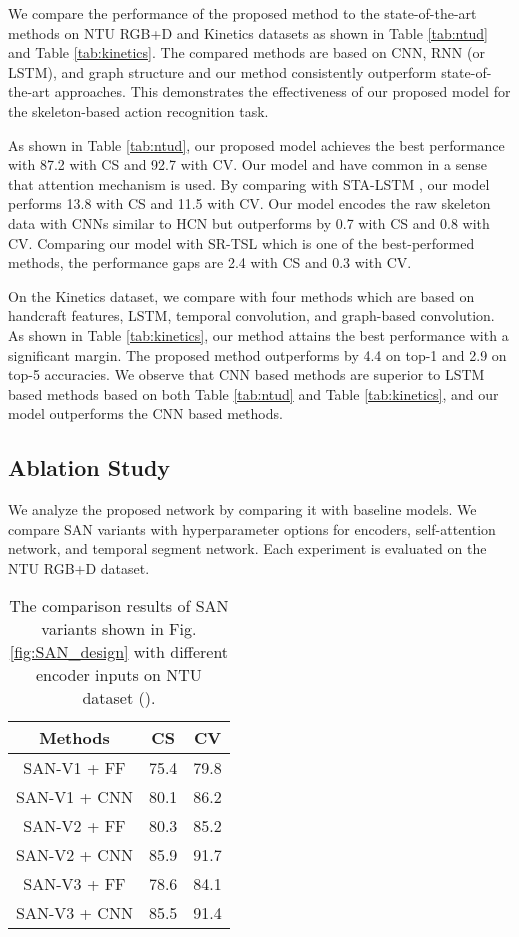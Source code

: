 \documentclass[10pt,twocolumn,letterpaper]{article}
\begin{document}
We compare the performance of the proposed method to the state-of-the-art methods on NTU RGB+D and Kinetics datasets as shown in Table \ref{tab:ntud} and Table \ref{tab:kinetics}. The compared methods are based on CNN, RNN (or LSTM), and graph structure and our method consistently outperform state-of-the-art approaches. This demonstrates the effectiveness of our proposed model for the skeleton-based action recognition task.

As shown in Table \ref{tab:ntud}, our proposed model achieves the best performance with 87.2 with CS and 92.7 with CV. Our model and \cite{STOA:STA-LSTM} have common in a sense that attention mechanism is used. By comparing with STA-LSTM \cite{STOA:STA-LSTM}, our model performs 13.8 with CS and 11.5 with CV. Our model encodes the raw skeleton data with CNNs similar to HCN \cite{STOA:HCN} but outperforms by 0.7 with CS and 0.8 with CV. Comparing our model with SR-TSL \cite{STOA:SR-TSL} which is one of the best-performed methods, the performance gaps are 2.4 with CS and 0.3 with CV.

On the Kinetics dataset, we compare with four methods which are based on handcraft features, LSTM, temporal convolution, and graph-based convolution. As shown in Table \ref{tab:kinetics}, our method attains the best performance with a significant margin. The proposed method outperforms by 4.4 on top-1 and 2.9 on top-5 accuracies.
We observe that CNN based methods \cite{STOA:HCN, STOA:SR-TSL, STOA:stgcn, STOA:Temporal_Conv} are superior to LSTM based methods \cite{STOA:VA-LSTM, STOA:ENS_TS-LSTM, STOA:PA-LSTM} based on both Table \ref{tab:ntud} and Table \ref{tab:kinetics}, and our model outperforms the CNN based methods.


\subsection{Ablation Study}
We analyze the proposed network by comparing it with baseline models. 
We compare SAN variants with hyperparameter options for encoders, self-attention network, and temporal segment network.
Each experiment is evaluated on the NTU RGB+D dataset.

\begin{table}[!t]
	\begin{center}
	\begin{tabular}{|c|c|c|}
		\hline
		Methods & CS & CV\\
		\hline
		SAN-V1 + FF  & 75.4 & 79.8\\
		SAN-V1 + CNN  & 80.1 & 86.2\\
		SAN-V2 + FF  & 80.3 & 85.2 \\
		SAN-V2 + CNN  & 85.9 & 91.7\\
		SAN-V3 + FF  & 78.6 & 84.1\\
		SAN-V3 + CNN  & 85.5 & 91.4\\
		\hline
	\end{tabular}
	\end{center}
	\vspace{-0.15in}
	\caption{The comparison results of SAN variants shown in Fig. \ref{fig:SAN_design} with different encoder inputs on NTU dataset ().}
	\label{tab:SAN-base-ablation}
\end{table}
\end{document}
